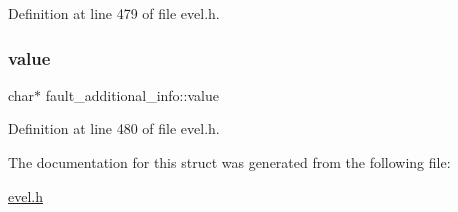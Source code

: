 Definition at line 479 of file evel.\+h.

\hypertarget{structfault__additional__info_aed1daed022cd49c694feccc8635236c4}{}\label{structfault__additional__info_aed1daed022cd49c694feccc8635236c4} 
\subsubsection{\texorpdfstring{value}{value}}
{\footnotesize\ttfamily char$\ast$ fault\+\_\+additional\+\_\+info\+::value}



Definition at line 480 of file evel.\+h.



The documentation for this struct was generated from the following file\+:\begin{DoxyCompactItemize}
\item 
\hyperlink{evel_8h}{evel.\+h}\end{DoxyCompactItemize}
